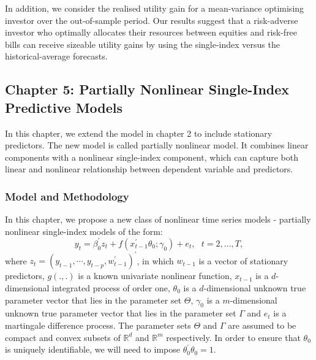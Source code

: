 \documentclass[a4paper,12pt,times,numbered,print,index]{report}
\numberwithin{equation}{section}
\begin{document}
In addition, we consider the realised utility gain for a mean-variance optimising investor over the out-of-sample period. Our results suggest that a risk-adverse investor who optimally allocates their resources between equities and risk-free bills can receive sizeable utility gains by using the single-index versus the historical-average forecasts.

\pagebreak

\subsection*{Chapter 5: Partially Nonlinear Single-Index Predictive Models}
In this chapter, we extend the model in chapter 2 to include stationary predictors. The new model is called partially nonlinear model. It combines linear components with a nonlinear single-index component, which can capture both linear and nonlinear relationship between dependent variable and predictors.

\subsubsection*{Model and Methodology}

In this chapter, we propose a new class of nonlinear time series models - partially nonlinear single-index models of the form:
\begin{equation}
	y_{t} = \beta_0^{\prime} z_t + f\left( x_{t-1}^{\prime }\theta_0; \gamma_0\right) +e_{t},\ \ \
	t=2,...,T,  
	\label{PL model}
\end{equation}%
where $z_t = (y_{t-1}, \cdots, y_{t-p}, w_{t-1}^{\prime})^{\prime}$, in which $w_{t-1}$ is a vector of stationary predictors, 
$g\left( .,.\right) $ is a known univariate nonlinear function, $x_{t-1}$ is a $d$-dimensional integrated process of order one, $\theta _{0}$ is a $d$-dimensional unknown true parameter vector that lies in the parameter set $\Theta $, $\gamma _{0}$ is a $m$-dimensional unknown true parameter vector that lies in the parameter set $\Gamma $ and $e_{t}$ is a martingale
difference process. The parameter sets $\Theta $ and $\Gamma $ are assumed to be compact and convex subsets of $\mathbb{R}^{d}$ and $\mathbb{R}^{m}$ respectively. In order to ensure that $\theta_0$ is uniquely identifiable, we will need to impose $\theta_{0}^{\prime}\theta_{0} = 1$. 
\end{document}
